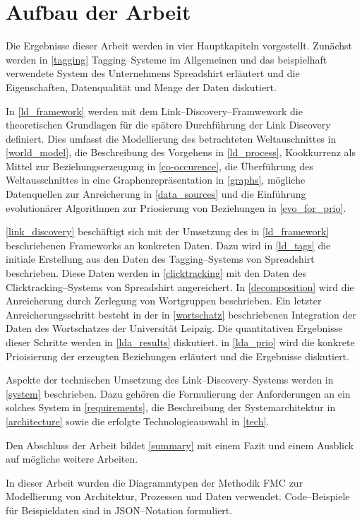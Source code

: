 \section{Aufbau der Arbeit}

Die Ergebnisse dieser Arbeit werden in vier Hauptkapiteln vorgestellt. Zunächst werden in \cref{tagging} Tagging--Systeme im Allgemeinen und das beispielhaft verwendete System des Unternehmens Spreadshirt erläutert und die Eigenschaften, Datenqualität und Menge der Daten diskutiert.

In \cref{ld_framework} werden mit dem Link--Discovery--Framwework die theoretischen Grundlagen für die spätere Durchführung der Link Discovery definiert. Dies umfasst die Modellierung des betrachteten Weltauschnittes in \cref{world_model}, die Beschreibung des Vorgehens in \cref{ld_process}, Kookkurrenz als Mittel zur Beziehungserzeugung in \cref{co-occurence}, die Überführung des Weltausschnittes in eine Graphenrepräsentation in \cref{graphs}, mögliche Datenquellen zur Anreicherung in \cref{data_sources} und die Einführung evolutionärer Algorithmen zur Priosierung von Beziehungen in \cref{evo_for_prio}.

\cref{link_discovery} beschäftigt sich mit der Umsetzung des in \cref{ld_framework} beschriebenen Frameworks an konkreten Daten. Dazu wird in \cref{ld_tags} die initiale Erstellung aus den Daten des Tagging--Systems von Spreadshirt beschrieben. Diese Daten werden in \cref{clicktracking} mit den Daten des Clicktracking--Systems von Spreadshirt angereichert. In \cref{decomposition} wird die Anreicherung durch Zerlegung von Wortgruppen beschrieben. Ein letzter Anreicherungsschritt besteht in der in \cref{wortschatz} beschriebenen Integration der Daten des Wortschatzes der Universität Leipzig. Die quantitativen Ergebnisse dieser Schritte werden in \cref{lda_results} diskutiert. in \cref{lda_prio} wird die konkrete Prioisierung der erzeugten Beziehungen erläutert und die Ergebnisse diskutiert.

Aspekte der technischen Umsetzung des Link--Discovery--Systems werden in \cref{system} beschrieben. Dazu gehören die Formulierung der Anforderungen an ein solches System in \cref{requirements}, die Beschreibung der Systemarchitektur in \cref{architecture} sowie die erfolgte Technologieauswahl in \cref{tech}.

Den Abschluss der Arbeit bildet \cref{summary} mit einem Fazit und einem Ausblick auf mögliche weitere Arbeiten.

In dieser Arbeit wurden die Diagrammtypen der Methodik FMC \cite{fmc} zur Modellierung von Architektur, Prozessen und Daten verwendet. Code--Beispiele für Beispieldaten sind in JSON--Notation \cite{json2006} formuliert.
